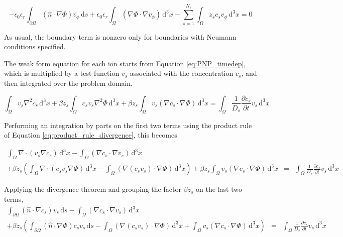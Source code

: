 \begin{equation}
-\epsilon_{0}\epsilon_{r} \int_{\partial\Omega} \left( \hat{n} \cdot \nabla \Phi \right) v_\phi \,\mathrm{d}s
+ \epsilon_{0}\epsilon_{r} \int_\Omega  \left( \nabla \Phi \cdot \nabla v_\phi \right) \,\mathrm{d}^3x
- \sum_{s=1}^{N_s} \int_\Omega z_s c_s v_\phi \,\mathrm{d}^3x = 0
\end{equation}

As usual, the boundary term is nonzero only for boundaries with Neumann conditions specified.

The weak form equation for each ion starts from Equation \ref{eq:PNP_timedep},
which is multiplied by a test function $v_s$ associated with the concentration $c_s$,
and then integrated over the problem domain.

\begin{equation}
\int_\Omega v_s \nabla^2 c_s \,\mathrm{d}^3x 
+ \beta z_s \int_\Omega c_s v_s \nabla^2 \Phi \,\mathrm{d}^3x
+ \beta z_s \int_\Omega  v_s \left( \nabla c_s \cdot \nabla \Phi \right) \,\mathrm{d}^3x
= \int_\Omega \frac{1}{D_s} \frac{\partial c_s}{\partial t} v_s \,\mathrm{d}^3x
\end{equation}

Performing an integration by parts on the first two terms
using the product rule of Equation \ref{eq:product_rule_divergence}, this becomes

\begin{equation}
\begin{aligned}
\int_\Omega \nabla \cdot \left( v_s \nabla c_s \right) \,\mathrm{d}^3x
- \int_\Omega \left( \nabla c_s \cdot \nabla v_s \right) \,\mathrm{d}^3x \\
+ \beta z_s \left( \int_\Omega \nabla \cdot \left( c_s v_s \nabla \Phi \right) \,\mathrm{d}^3x
- \int_\Omega \left( \nabla \left( c_s v_s \right)  \cdot \nabla \Phi \right) \,\mathrm{d}^3x \right) 
+ \beta z_s \int_\Omega  v_s \left( \nabla c_s \cdot \nabla \Phi \right) \,\mathrm{d}^3x
& = & \int_\Omega \frac{1}{D_s} \frac{\partial c_s}{\partial t} v_s \,\mathrm{d}^3x
\end{aligned}
\end{equation}

Applying the divergence theorem and grouping the factor $\beta z_s$ on the last two terms,
\begin{equation}
\begin{aligned}
\int_{\partial\Omega} \left( \hat{n} \cdot \nabla c_s \right) v_s \,\mathrm{d}s
- \int_\Omega \left( \nabla c_s \cdot \nabla v_s \right) \,\mathrm{d}^3x \\
+ \beta z_s \left( \int_{\partial\Omega} \left( \hat{n} \cdot \nabla \Phi \right) c_s v_s \,\mathrm{d}s
- \int_\Omega \left( \nabla \left( c_s v_s \right)  \cdot \nabla \Phi \right) \,\mathrm{d}^3x
+ \int_\Omega  v_s \left( \nabla c_s \cdot \nabla \Phi \right) \,\mathrm{d}^3x \right) 
& = & \int_\Omega \frac{1}{D_s} \frac{\partial c_s}{\partial t} v_s \,\mathrm{d}^3x
\end{aligned}
\end{equation}

